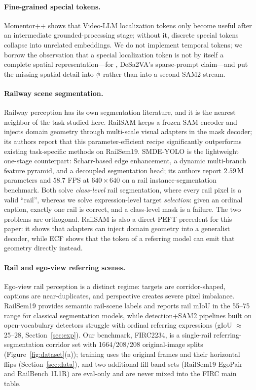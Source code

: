 \paragraph{Fine-grained special tokens.}
Momentor++ \citep{li2026momentorpp} shows that Video-LLM localization tokens only become useful after an intermediate grounded-processing stage; without it, discrete special tokens collapse into unrelated embeddings.
We do not implement temporal tokens; we borrow the observation that a special localization token is not by itself a complete spatial representation---for \Seg{}, DeSa2VA's sparse-prompt claim---and put the missing spatial detail into $\phi$ rather than into a second SAM2 stream.

\paragraph{Railway scene segmentation.}
Railway perception has its own segmentation literature, and it is the nearest neighbor of the task studied here.
RailSAM \citep{zhang2025railsam} keeps a frozen SAM encoder and injects domain geometry through multi-scale visual adapters in the mask decoder; its authors report that this parameter-efficient recipe significantly outperforms existing task-specific methods on RailSem19.
SMDE-YOLO \citep{lin2026smdeyolo} is the lightweight one-stage counterpart: Scharr-based edge enhancement, a dynamic multi-branch feature pyramid, and a decoupled segmentation head; its authors report $2.59$\,M parameters and $58.7$ FPS at $640{\times}640$ on a rail instance-segmentation benchmark.
Both solve \emph{class-level} rail segmentation, where every rail pixel is a valid ``rail'', whereas we solve expression-level target \emph{selection}: given an ordinal caption, exactly one rail is correct, and a class-level mask is a failure.
The two problems are orthogonal.
RailSAM is also a direct PEFT precedent for this paper: it shows that adapters can inject domain geometry into a generalist decoder, while ECF shows that the \Seg{} token of a referring model can emit that geometry directly instead.

\paragraph{Rail and ego-view referring scenes.}
Ego-view rail perception is a distinct regime: targets are corridor-shaped, captions are near-duplicates, and perspective creates severe pixel imbalance.
RailSem19 \citep{zendel2019railsem19} provides semantic rail-scene labels and reports rail mIoU in the 55--75 range for classical segmentation models, while detection+SAM2 pipelines built on open-vocabulary detectors \citep{liu2024groundingdino,bai2025qwen2vl} struggle with ordinal referring expressions (gIoU ${\approx}$25--28, Section~\ref{sec:exp}).
Our benchmark, FIRC2234, is a single-rail referring-segmentation corridor set with 1664/208/208 original-image splits (Figure~\ref{fig:dataset}(a)); training uses the original frames and their horizontal flips (Section~\ref{sec:data}), and two additional fill-band sets (RailSem19-EgoPair and RailBench 1L1R) are eval-only and are never mixed into the FIRC main table.

